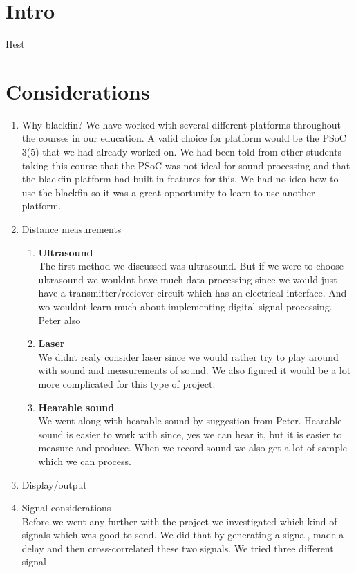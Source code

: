 \chapter{Intro}
Hest

\chapter{Considerations}
\begin{enumerate}
\item Why blackfin?
We have worked with several different platforms throughout the courses in our education. A valid choice for platform would be the PSoC 3(5) that we had already worked on. We had been told from other students taking this course that the PSoC was not ideal for sound processing and that the blackfin platform had built in features for this. We had no idea how to use the blackfin so it was a great opportunity to learn to use another platform. 
\item Distance measurements
\begin{enumerate}

\item \textbf{Ultrasound}\\
The first method we discussed was ultrasound. But if we were to choose ultrasound we wouldnt have much data processing since we would just have a transmitter/reciever circuit which has an electrical interface. And wo wouldnt learn much about implementing digital signal processing. Peter also 

\item \textbf{Laser}\\
We didnt realy consider laser since we would rather try to play around with sound and measurements of sound. We also figured it would be a lot more complicated for this type of project.

\item \textbf{Hearable sound}\\
We went along with hearable sound by suggestion from Peter. Hearable sound is easier to work with since, yes we can hear it, but it is easier to measure and produce. When we record sound we also get a lot of sample which we can process.
\end{enumerate}

\item Display/output
\item Signal considerations\\
Before we went any further with the project we investigated which kind of signals which was good to send. We did that by generating a signal, made a delay and then cross-correlated these two signals.
We tried three different signal
\end{enumerate}
